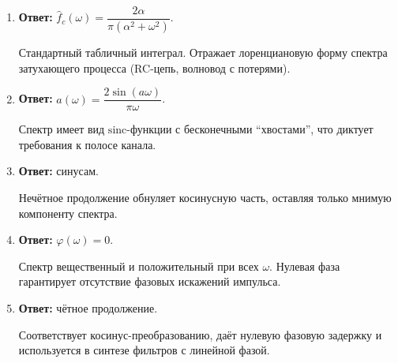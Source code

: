 \documentclass[12pt,a4paper]{article}
\begin{document}
\begin{enumerate}[label=\textbf{2.\arabic*.}]
    \item \textbf{Ответ:} $\hat{f}_c(\omega) = \dfrac{2\alpha}{\pi(\alpha^2+\omega^2)}$. \begin{applink}Стандартный табличный интеграл. Отражает лоренциановую форму спектра затухающего процесса (RC-цепь, волновод с потерями).\end{applink}
    \item \textbf{Ответ:} $a(\omega) = \dfrac{2\sin(a\omega)}{\pi\omega}$. \begin{applink}Спектр имеет вид $\text{sinc}$-функции с бесконечными ``хвостами'', что диктует требования к полосе канала.\end{applink}
    \item \textbf{Ответ:} синусам. \begin{applink}Нечётное продолжение обнуляет косинусную часть, оставляя только мнимую компоненту спектра.\end{applink}
    \item \textbf{Ответ:} $\varphi(\omega) = 0$. \begin{applink}Спектр вещественный и положительный при всех $\omega$. Нулевая фаза гарантирует отсутствие фазовых искажений импульса.\end{applink}
    \item \textbf{Ответ:} чётное продолжение. \begin{applink}Соответствует косинус-преобразованию, даёт нулевую фазовую задержку и используется в синтезе фильтров с линейной фазой.\end{applink}
\end{enumerate}
\end{document}
